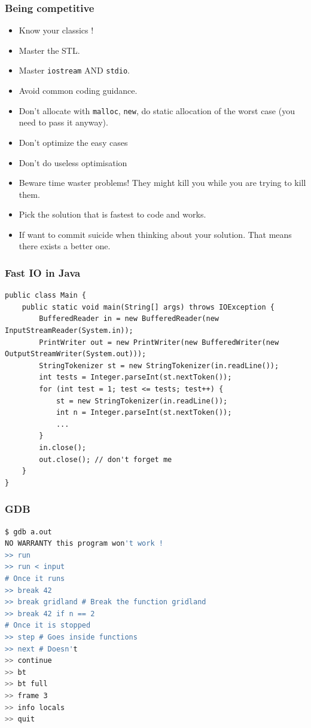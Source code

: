 \documentclass[10pt,svgnames,usenames,table]{beamer} %
\begin{document}
\begin{frame}
  \frametitle{Being competitive}
  \begin{itemize}
    \item Know your classics !
    \item Master the STL.
    \item Master \lstinline|iostream| AND \lstinline|stdio|.
    \item Avoid common coding guidance.
    \item Don't allocate with \lstinline|malloc|, \lstinline|new|,
      do static allocation of the worst case (you need to pass it anyway).
    \item Don't optimize the easy cases
    \item Don't do useless optimisation
    \item Beware time waster problems! They might kill you while you are trying to kill them.
    \item Pick the solution that is fastest to code and works.
    \item If want to commit suicide when thinking about your solution.
      That means there exists a better one.
  \end{itemize}
\end{frame}

\begin{frame}[fragile]
  \frametitle{Fast IO in Java}
  \begin{lstlisting}
public class Main {
	public static void main(String[] args) throws IOException {
		BufferedReader in = new BufferedReader(new InputStreamReader(System.in));
		PrintWriter out = new PrintWriter(new BufferedWriter(new OutputStreamWriter(System.out)));
		StringTokenizer st = new StringTokenizer(in.readLine());
		int tests = Integer.parseInt(st.nextToken());
		for (int test = 1; test <= tests; test++) {
			st = new StringTokenizer(in.readLine());
			int n = Integer.parseInt(st.nextToken());
            ...
		}
		in.close();
		out.close(); // don't forget me
	}
}
  \end{lstlisting}
\end{frame}

\begin{frame}[fragile]
  \frametitle{GDB}
  \begin{lstlisting}[language=sh]
$ gdb a.out
NO WARRANTY this program won't work !
>> run
>> run < input
# Once it runs
>> break 42
>> break gridland # Break the function gridland
>> break 42 if n == 2
# Once it is stopped
>> step # Goes inside functions
>> next # Doesn't
>> continue
>> bt
>> bt full
>> frame 3
>> info locals
>> quit
  \end{lstlisting}
\end{frame}
\end{document}
